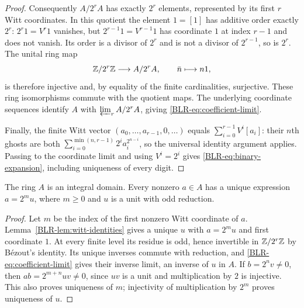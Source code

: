 \begin{proof}
Consequently $A/2^rA$ has exactly $2^r$ elements, represented by its first
$r$ Witt coordinates. In this quotient the element $1=[1]$ has additive
order exactly $2^r$: $2^r1=V^r1$ vanishes, but
$2^{r-1}1=V^{r-1}1$ has coordinate $1$ at index $r-1$ and does not vanish.
Its order is a divisor of $2^r$ and is not a divisor of $2^{r-1}$, so is
$2^r$. The unital ring map
\[
 \mathbb Z/2^r\mathbb Z\longrightarrow A/2^rA,\qquad \bar n\longmapsto n1,
\]
is therefore injective and, by equality of the finite cardinalities,
surjective. These ring isomorphisms commute with the quotient maps.
The underlying coordinate sequences identify $A$ with
$\varprojlim_r A/2^rA$, giving \eqref{BLR-eq:coefficient-limit}.

Finally, the finite Witt vector $(a_0,\ldots,a_{r-1},0,\ldots)$ equals
$\sum_{i=0}^{r-1}V^i[a_i]$: their $n$th ghosts are both
$\sum_{i=0}^{\min(n,r-1)}2^ia_i^{2^{n-i}}$, so the universal identity
argument applies. Passing to the coordinate limit and using $V^i=2^i$
gives \eqref{BLR-eq:binary-expansion}, including uniqueness of every digit.
\end{proof}

\begin{lemma}\label{BLR-lem:domain}
The ring $A$ is an integral domain. Every nonzero $a\in A$ has a unique
expression $a=2^m u$, where $m\geq0$ and $u$ is a unit with odd reduction.
\end{lemma}
\begin{proof}
Let $m$ be the index of the first nonzero Witt coordinate of $a$.
Lemma~\ref{BLR-lem:witt-identities} gives a unique $u$ with $a=2^m u$ and
first coordinate $1$. At every finite level its residue is odd, hence
invertible in $\mathbb Z/2^r\mathbb Z$ by B\'ezout's identity. Its unique inverses
commute with reduction, and \eqref{BLR-eq:coefficient-limit} gives their
inverse limit, an inverse of $u$ in $A$. If
$b=2^n v\ne0$, then $ab=2^{m+n}uv\ne0$, since $uv$ is a unit and
multiplication by $2$ is injective. This also proves uniqueness of $m$;
injectivity of multiplication by $2^m$ proves uniqueness of $u$.
\end{proof}


